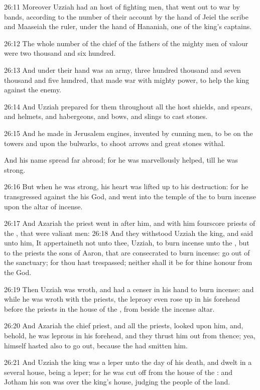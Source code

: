 26:11 Moreover Uzziah had an host of fighting men, that went out to war by bands, according to the number of their account by the hand of Jeiel the scribe and Maaseiah the ruler, under the hand of Hananiah, one of the king's captains.

26:12 The whole number of the chief of the fathers of the mighty men of valour were two thousand and six hundred.

26:13 And under their hand was an army, three hundred thousand and seven thousand and five hundred, that made war with mighty power, to help the king against the enemy.

26:14 And Uzziah prepared for them throughout all the host shields, and spears, and helmets, and habergeons, and bows, and slings to cast stones.

26:15 And he made in Jerusalem engines, invented by cunning men, to be on the towers and upon the bulwarks, to shoot arrows and great stones withal.

And his name spread far abroad; for he was marvellously helped, till he was strong.

26:16 But when he was strong, his heart was lifted up to his destruction: for he transgressed against the \LORD his God, and went into the temple of the \LORD to burn incense upon the altar of incense.

26:17 And Azariah the priest went in after him, and with him fourscore priests of the \LORD, that were valiant men: 26:18 And they withstood Uzziah the king, and said unto him, It appertaineth not unto thee, Uzziah, to burn incense unto the \LORD, but to the priests the sons of Aaron, that are consecrated to burn incense: go out of the sanctuary; for thou hast trespassed; neither shall it be for thine honour from the \LORD God.

26:19 Then Uzziah was wroth, and had a censer in his hand to burn incense: and while he was wroth with the priests, the leprosy even rose up in his forehead before the priests in the house of the \LORD, from beside the incense altar.

26:20 And Azariah the chief priest, and all the priests, looked upon him, and, behold, he was leprous in his forehead, and they thrust him out from thence; yea, himself hasted also to go out, because the \LORD had smitten him.

26:21 And Uzziah the king was a leper unto the day of his death, and dwelt in a several house, being a leper; for he was cut off from the house of the \LORD: and Jotham his son was over the king's house, judging the people of the land.

